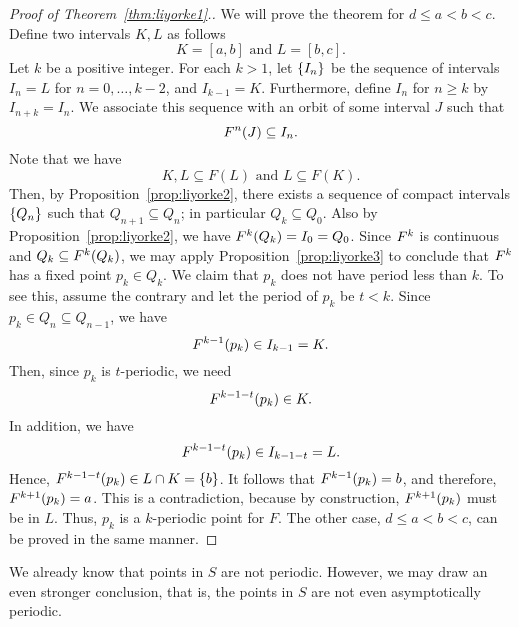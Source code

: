 \documentclass[10pt,draft,twoside]{book}
\begin{document}
\begin{proof}[Proof of Theorem~\ref{thm:liyorke1}.]
  We will prove the theorem for $d \leq a < b < c$.
  Define two intervals $K,L$ as follows
  \begin{equation*}
    K = [a,b] \mbox{ and } L = [b,c].
  \end{equation*}
  Let $k$ be a positive integer.
  For each $k > 1$, let $\left \{ I_n \right \}$ be the sequence of intervals $I_n = L$ for $n = 0, \ldots, k-2$, and $I_{k-1} = K$.
  Furthermore, define $I_n$ for $n \geq k$ by $I_{n+k} = I_n$.
  We associate this sequence with an orbit of some interval $J$ such that
  \begin{equation*}
    F^{n}(J) \subseteq I_n.
  \end{equation*}
  Note that we have 
  \begin{equation*}
    K,L \subseteq F(L) \mbox{ and } L \subseteq F(K).
  \end{equation*}
  Then, by Proposition~\ref{prop:liyorke2}, there exists a sequence of compact intervals $\left \{ Q_n \right \}$ such that $Q_{n+1} \subseteq Q_{n}$; in particular $Q_k \subseteq Q_0$.
  Also by Proposition~\ref{prop:liyorke2}, we have $F^{k}(Q_k) = I_0 = Q_0$.
  Since $F^{k}$ is continuous and $Q_k \subseteq F^{k}(Q_k)$, we may apply Proposition~\ref{prop:liyorke3} to conclude that $F^{k}$ has a fixed point $p_k \in Q_k$.
  We claim that $p_k$ does not have period less than $k$.
  To see this, assume the contrary and let the period of $p_k$ be $t < k$.
  Since $p_k \in Q_n \subseteq Q_{n-1}$, we have 
  \begin{equation*}
    F^{k-1}(p_k) \in I_{k-1} = K.
  \end{equation*}
  Then, since $p_k$ is $t$-periodic, we need 
  \begin{equation*}
    F^{k-1-t}(p_k) \in K.
  \end{equation*}
  In addition, we have
  \begin{equation*}
    F^{k-1-t}(p_k) \in I_{k-1-t} = L.
  \end{equation*}
  Hence, $F^{k-1-t}(p_k) \in L \cap K = \left \{ b \right \}$.
  It follows that $F^{k-1}(p_k) = b$, and therefore, $F^{k+1}(p_k) = a$.
  This is a contradiction, because by construction, $F^{k+1}(p_k)$ must be in $L$.
  Thus, $p_k$ is a $k$-periodic point for $F$.
  The other case, $d \leq a < b < c$, can be proved in the same manner.
\end{proof}
We already know that points in $S$ are not periodic.
However, we may draw an even stronger conclusion, that is, the points in $S$ are not even asymptotically periodic.
\end{document}

